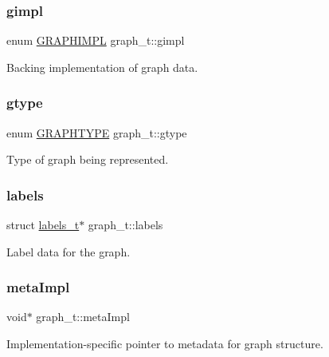 \subsubsection{\texorpdfstring{gimpl}{gimpl}}
{\footnotesize\ttfamily enum \hyperlink{graphdata_8h_ad7f3a639f97221897a0429715dccefe6}{G\+R\+A\+P\+H\+I\+M\+PL} graph\+\_\+t\+::gimpl}



Backing implementation of graph data. 

\mbox{\label{structgraph__t_a602be255ab0523e0a5fe28436a29159a}} 
\subsubsection{\texorpdfstring{gtype}{gtype}}
{\footnotesize\ttfamily enum \hyperlink{graphdata_8h_a384e88b524b782ff50439055cbc8a5c2}{G\+R\+A\+P\+H\+T\+Y\+PE} graph\+\_\+t\+::gtype}



Type of graph being represented. 

\mbox{\label{structgraph__t_ab0661b91402642806325cb4f4da9dc24}} 
\subsubsection{\texorpdfstring{labels}{labels}}
{\footnotesize\ttfamily struct \hyperlink{structlabels__t}{labels\+\_\+t}$\ast$ graph\+\_\+t\+::labels}



Label data for the graph. 

\mbox{\label{structgraph__t_ab11b23897ec5b39d38c3f85581bd313e}} 
\subsubsection{\texorpdfstring{meta\+Impl}{metaImpl}}
{\footnotesize\ttfamily void$\ast$ graph\+\_\+t\+::meta\+Impl}



Implementation-\/specific pointer to metadata for graph structure. 


